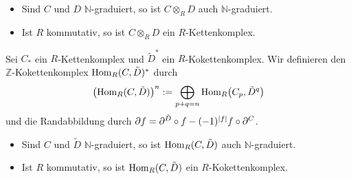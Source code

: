 \begin{bemerkung}
	\leavevmode
	\begin{itemize}[itemsep=0pt]
		\item Sind $C$ und $D$ $\mathbb{N}$-graduiert, so ist $C \otimes_R D$ auch $\mathbb{N}$-graduiert. 
		\item Ist $R$ kommutativ, so ist $C \otimes_R D$ ein $R$-Kettenkomplex.
	\end{itemize}
\end{bemerkung}

\begin{definition}
	Sei $C_*$ ein $R$-Kettenkomplex und $\tilde{D}^*$ ein $R$-Kokettenkomplex.
	Wir definieren den $\mathbb{Z}$-Kokettenkomplex $\Hom_R(C,\tilde{D})^*$ durch 
	\[
		\enbrace*{\Hom_R(C,\tilde{D})}^n := \bigoplus_{p+q=n} \Hom_R \enbrace*{C_p, \tilde{D}^q}
	\]
	und die Randabbildung durch
	\(
		\partial f = \partial^{\tilde{D}} \circ f - (-1)^{\abs*{f}} f \circ \partial^C
	\).
\end{definition}

\begin{bemerkung}
	\leavevmode
	\begin{itemize}[itemsep=0pt]
		\item Sind $C$ und $\tilde{D}$ $\mathbb{N}$-graduiert, so ist  $\Hom_R(C,\tilde{D})$ auch $\mathbb{N}$-graduiert.
		\item Ist $R$ kommutativ, so ist $\Hom_R(C,\tilde{D})$ ein $R$-Kokettenkomplex.
	\end{itemize}
\end{bemerkung}

